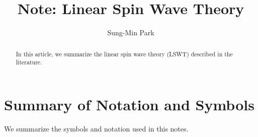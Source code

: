 \documentclass[aps, prx, nofootinbib, superscriptaddress]{revtex4-2}
\begin{document}
\title{Note: Linear Spin Wave Theory}
\author{Sung-Min Park}
\begin{abstract}
    In this article, we summarize the linear spin wave theory (LSWT) described in the literature.
\end{abstract}
\maketitle

\tableofcontents

\newpage
\section*{Summary of Notation and Symbols}



We summarize the symbols and notation used in this notes.
\end{document}
